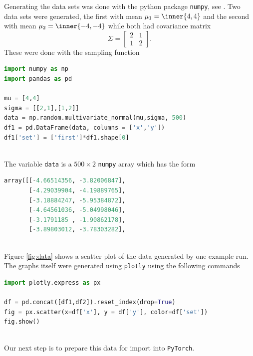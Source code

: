 \documentclass[12pt,letterpaper]{article}
\begin{document}
Generating the data sets was done with the python package \texttt{numpy}, see \cite{harris2020array}.
Two data sets were generated, the first with mean $\mu_1 = \inner{4,4}$ and the second with mean $\mu_2 = \inner{-4,-4}$ while both had covariance matrix
\begin{equation*}
	\Sigma = 
	\begin{bmatrix}
		2 & 1 \\ 1 & 2
	\end{bmatrix}.
\end{equation*}
These were done with the sampling function \\
\indent
\begin{minipage}[t]{.9\textwidth}
\begin{lstlisting}[language=Python]
import numpy as np
import pandas as pd

mu = [4,4]
sigma = [[2,1],[1,2]]
data = np.random.multivariate_normal(mu,sigma, 500)
df1 = pd.DataFrame(data, columns = ['x','y'])
df1['set'] = ['first']*df1.shape[0]
\end{lstlisting}
\end{minipage} \\
The variable \texttt{data} is a $500\times 2$ \texttt{numpy} array which has the form \\
\indent
\begin{minipage}[t]{.9\textwidth}
\begin{lstlisting}[language=Python]
array([[-4.66514356, -3.82006847],
       [-4.29039904, -4.19889765],
       [-3.18884247, -5.95384872],
       [-4.64561036, -5.04998046],
       [-3.1791185 , -1.90862178],
       [-3.89803012, -3.78303282],
\end{lstlisting}
\end{minipage} \\
Figure \ref{fig:data} shows a scatter plot of the data generated by one example run.  The graphs itself were generated using \texttt{plotly} using the following commands \\
\indent
\begin{minipage}[t]{.9\textwidth}
\begin{lstlisting}[language=Python]
import plotly.express as px

df = pd.concat([df1,df2]).reset_index(drop=True)
fig = px.scatter(x=df['x'], y = df['y'], color=df['set'])
fig.show()
\end{lstlisting}
\end{minipage} \\
Our next step is to prepare this data for import into \texttt{PyTorch}.  
\end{document}
